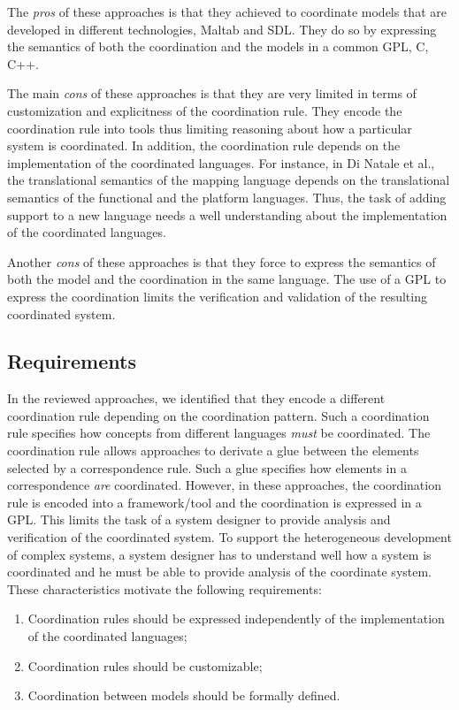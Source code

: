 The \emph{pros} of these approaches is that they achieved to coordinate models that are developed in different technologies, \ie Maltab and SDL. They do so by expressing the semantics of both the coordination and the models in a common GPL, \ie C, C++. 

The main \emph{cons} of these approaches is that they are very limited in terms of customization and explicitness of the coordination rule. They encode the coordination rule into tools thus limiting reasoning about how a particular system is coordinated. In addition, the coordination rule depends on the implementation of the coordinated languages. For instance, in Di Natale et al., the translational semantics of the mapping language depends on the translational semantics of the functional and the platform languages. Thus, the task of adding support to a new language needs a well understanding about the implementation of the coordinated languages.

Another \emph{cons} of these approaches is that they force to express the semantics of both the model and the coordination in the same language. The use of a GPL to express the coordination limits the verification and validation of the resulting coordinated system. 
	
\subsection{Requirements}
In the reviewed approaches, we identified that they encode a different coordination rule depending on the coordination pattern. Such a coordination rule specifies how concepts from different languages \emph{must} be coordinated. The coordination rule allows approaches to derivate a glue between the elements selected by a correspondence rule. Such a glue specifies how elements in a correspondence \emph{are} coordinated. However, in these approaches, the coordination rule is encoded into a framework/tool and the coordination is expressed in a GPL. This limits the task of a system designer to provide analysis and verification of the coordinated system. To support the heterogeneous development of complex systems, a system designer has to understand well how a system is coordinated and he must be able to provide analysis of the coordinate system. These characteristics motivate the following requirements:
	\begin{enumerate}
		\item Coordination rules should be expressed independently of the implementation of the coordinated languages;  
		\item Coordination rules should be customizable;
		\item Coordination between models should be formally defined. 
	\end{enumerate}
	
